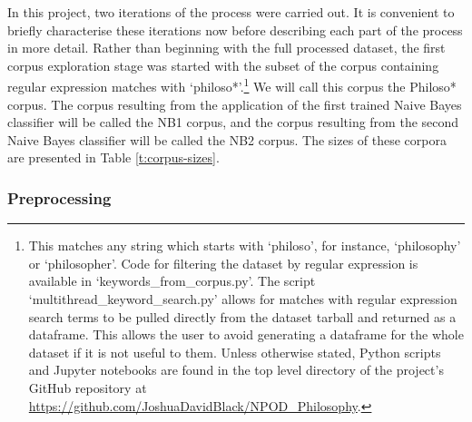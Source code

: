 \documentclass{article}
\begin{document}
In this project, two iterations of the process were carried out.
It is convenient to briefly characterise these iterations now before describing each part of the process in more detail. Rather than beginning with the full processed dataset, the first corpus exploration stage was started with the subset of the corpus containing regular expression matches with `philoso*'.\footnote{This matches any string which starts with `philoso', for instance, `philosophy' or `philosopher'. Code for filtering the dataset by regular expression is available in `keywords\_\-from\_\-corpus.py'. The script `multithread\_\-keyword\_\-search.py' allows for matches with regular expression search terms to be pulled directly from the dataset tarball and returned as a dataframe. This allows the user to avoid generating a dataframe for the whole dataset if it is not useful to them.  Unless otherwise stated, Python scripts and Jupyter notebooks are found in the top level directory of the project's GitHub repository at \url{https://github.com/JoshuaDavidBlack/NPOD_Philosophy}.
} We will call this corpus the Philoso* corpus. The corpus resulting from the application of the first trained Naive Bayes classifier will be called the NB1 corpus, and the corpus resulting from the second Naive Bayes classifier will be called the NB2 corpus. The sizes of these corpora are presented in Table \ref{t:corpus-sizes}.

\subsubsection{Preprocessing}\label{s:preprop}
\end{document}
